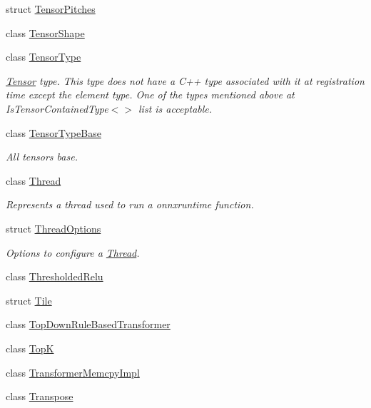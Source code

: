 \begin{DoxyCompactItemize}
\item 
struct \mbox{\hyperlink{structonnxruntime_1_1TensorPitches}{Tensor\+Pitches}}
\item 
class \mbox{\hyperlink{classonnxruntime_1_1TensorShape}{Tensor\+Shape}}
\item 
class \mbox{\hyperlink{classonnxruntime_1_1TensorType}{Tensor\+Type}}
\begin{DoxyCompactList}\small\item\em \mbox{\hyperlink{classonnxruntime_1_1Tensor}{Tensor}} type. This type does not have a C++ type associated with it at registration time except the element type. One of the types mentioned above at Is\+Tensor\+Contained\+Type$<$$>$ list is acceptable. \end{DoxyCompactList}\item 
class \mbox{\hyperlink{classonnxruntime_1_1TensorTypeBase}{Tensor\+Type\+Base}}
\begin{DoxyCompactList}\small\item\em All tensors base. \end{DoxyCompactList}\item 
class \mbox{\hyperlink{classonnxruntime_1_1Thread}{Thread}}
\begin{DoxyCompactList}\small\item\em Represents a thread used to run a onnxruntime function. \end{DoxyCompactList}\item 
struct \mbox{\hyperlink{structonnxruntime_1_1ThreadOptions}{Thread\+Options}}
\begin{DoxyCompactList}\small\item\em Options to configure a \mbox{\hyperlink{classonnxruntime_1_1Thread}{Thread}}. \end{DoxyCompactList}\item 
class \mbox{\hyperlink{classonnxruntime_1_1ThresholdedRelu}{Thresholded\+Relu}}
\item 
struct \mbox{\hyperlink{structonnxruntime_1_1Tile}{Tile}}
\item 
class \mbox{\hyperlink{classonnxruntime_1_1TopDownRuleBasedTransformer}{Top\+Down\+Rule\+Based\+Transformer}}
\item 
class \mbox{\hyperlink{classonnxruntime_1_1TopK}{TopK}}
\item 
class \mbox{\hyperlink{classonnxruntime_1_1TransformerMemcpyImpl}{Transformer\+Memcpy\+Impl}}
\item 
class \mbox{\hyperlink{classonnxruntime_1_1Transpose}{Transpose}}
\item 

\end{DoxyCompactItemize}
